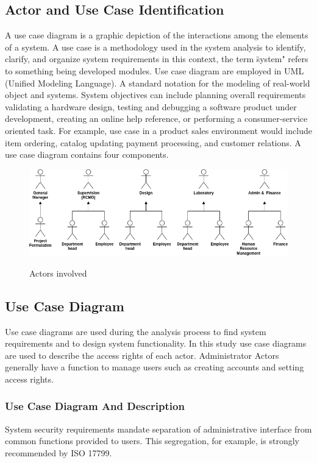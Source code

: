 \subsection{Actor and Use Case Identification}
A use case diagram is a graphic depiction of the interactions among the elements of a system. A use case is a methodology used in the system analysis to identify, clarify, and organize system requirements in this context, the term \"system" refers to something being developed modules. Use case diagram are employed in UML (Unified Modeling Language). A standard notation for the modeling of real-world object and systems. System objectives can include planning overall requirements validating a hardware design, testing and debugging a software product under development, creating an online help reference, or performing a consumer-service oriented task. For example, use case in a product sales environment would include item ordering, catalog updating payment processing, and customer relations. A use case diagram contains four components.

\begin{figure}[!h]
\includegraphics[width=13cm, keepaspectratio]{usecases/actors.png}
\label{shop_actors}
\caption{Actors involved }
\end{figure}

\subsection{Use Case Diagram}

Use case diagrams are used during the analysis
process to find system requirements and to design
system functionality. In this study use case
diagrams are used to describe the access rights of
each actor. Administrator Actors generally have a
function to manage users such as creating accounts
and setting access rights.

\subsubsection{Use Case Diagram And Description}
System security requirements mandate separation of administrative interface from common functions provided to users. This segregation, for example, is strongly recommended by ISO 17799.

